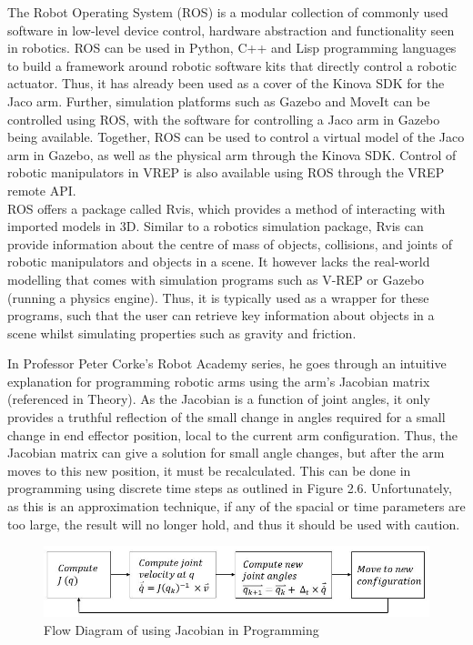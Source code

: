 \documentclass[12pt,openany,a4paper]{book}
\begin{document}
The Robot Operating System (ROS) is a modular collection of commonly used software in low-level device control, hardware abstraction and functionality seen in robotics. ROS can be used in Python, C++ and Lisp programming languages to build a framework around robotic software kits that directly control a robotic actuator. Thus, it has already been used as a cover of the Kinova SDK for the Jaco arm. Further, simulation platforms such as Gazebo and MoveIt can be controlled using ROS, with the software for controlling a Jaco arm in Gazebo being available. Together, ROS can be used to control a virtual model of the Jaco arm in Gazebo, as well as the physical arm through the Kinova SDK. Control of robotic manipulators in VREP is also available using ROS through the VREP remote API.\\
ROS offers a package called Rvis, which provides a method of interacting with imported models in 3D. Similar to a robotics simulation package, Rvis can provide information about the centre of mass of objects, collisions, and joints of robotic manipulators and objects in a scene. It however lacks the real-world modelling that comes with simulation programs such as V-REP or Gazebo (running a physics engine). Thus, it is typically used as a wrapper for these programs, such that the user can retrieve key information about objects in a scene whilst simulating properties such as gravity and friction.


In Professor Peter Corke's Robot Academy series, he goes through an intuitive explanation for programming robotic arms using the arm's Jacobian matrix (referenced in Theory). As the Jacobian is a function of joint angles, it only provides a truthful reflection of the small change in angles required for a small change in end effector position, local to the current arm configuration. Thus, the Jacobian matrix can give a solution for small angle changes, but after the arm moves to this new position, it must be recalculated. This can be done in programming using discrete time steps as outlined in Figure 2.6. Unfortunately, as this is an approximation technique, if any of the spacial or time parameters are too large, the result will no longer hold, and thus it should be used with caution.

\begin{center}
\begin{figure}[htb]
  \includegraphics[width=\linewidth]{jacobian_programming.jpg}
\caption{Flow Diagram of using Jacobian in Programming}
\end{figure}
\end{center}
\end{document}
